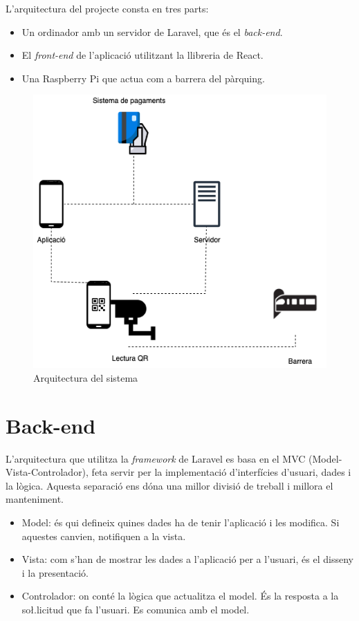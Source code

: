 L'arquitectura del projecte consta en tres parts:
\begin{itemize}
    \item Un ordinador amb un servidor de Laravel, que és el \emph{back-end}.
    \item El \emph{front-end} de l'aplicació utilitzant la llibreria de React.
    \item Una Raspberry Pi que actua com a barrera del pàrquing.
\end{itemize}

\begin{figure}[H]
    \begin{center}
        \includegraphics[scale=0.60]{Fotos/arquitectura_sistema.png}
    \end{center}
    \caption{Arquitectura del sistema}
    \label{fig:compiler_phases}
\end{figure}

\newpage
\section{Back-end}

L'arquitectura que utilitza la \emph{framework} de Laravel es basa en el MVC (Model-Vista-Controlador),
feta servir per la implementació d'interfícies d'usuari, dades i la lògica.
Aquesta separació ens dóna una millor divisió de treball i millora el manteniment.
\begin{itemize}
    \item Model: és qui defineix quines dades ha de tenir l'aplicació i les modifica. Si aquestes canvien, notifiquen a la vista.
    \item Vista: com s'han de mostrar les dades a l'aplicació per a l'usuari, és el disseny i la presentació.
    \item Controlador: on conté la lògica que actualitza el model. És la resposta a la so\l.licitud que fa l'usuari.
    Es comunica amb el model.
\end{itemize}

